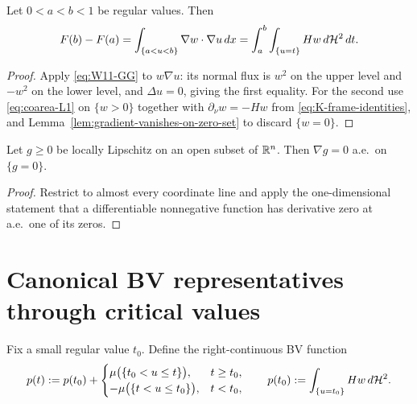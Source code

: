 \begin{lemma}\label{lem:K-slab-F}
Let $0<a<b<1$ be regular values.  Then
\begin{equation}\label{eq:K-slab-F}
  F(b)-F(a)
  =\int_{\{a<u<b\}}\nabla w\cdot\nabla u\,dx
  =\int_a^b\int_{\{u=t\}}Hw\,d\mathcal H^2\,dt .
\end{equation}
\end{lemma}

\begin{proof}
Apply \eqref{eq:W11-GG} to $w\nabla u$: its normal flux is $w^2$ on the upper
level and $-w^2$ on the lower level, and $\Delta u=0$, giving the first
equality.  For the second use \eqref{eq:coarea-L1} on $\{w>0\}$ together with
$\partial_\nu w=-Hw$ from \eqref{eq:K-frame-identities}, and
Lemma~\ref{lem:gradient-vanishes-on-zero-set} to discard $\{w=0\}$.
\end{proof}

\begin{lemma}
\label{lem:gradient-vanishes-on-zero-set}
Let $g\ge0$ be locally Lipschitz on an open subset of $\mathbb R^n$.  Then
$\nabla g=0$ a.e.\ on $\{g=0\}$.
\end{lemma}

\begin{proof}
Restrict to almost every coordinate line and apply the one-dimensional
statement that a differentiable nonnegative function has derivative zero at
a.e.\ one of its zeros.
\end{proof}

\section{Canonical BV representatives through critical values}

\begin{definition}\label{def:K-p}
Fix a small regular value $t_0$.  Define the right-continuous BV function
\begin{equation}\label{eq:K-p}
  p(t):=p(t_0)+
  \begin{cases}
    \mu\bigl(\{t_0<u\le t\}\bigr),&t\ge t_0,\\
   -\mu\bigl(\{t<u\le t_0\}\bigr),&t<t_0,
  \end{cases}
  \qquad
  p(t_0):=\int_{\{u=t_0\}}Hw\,d\mathcal H^2 .
\end{equation}
\end{definition}

